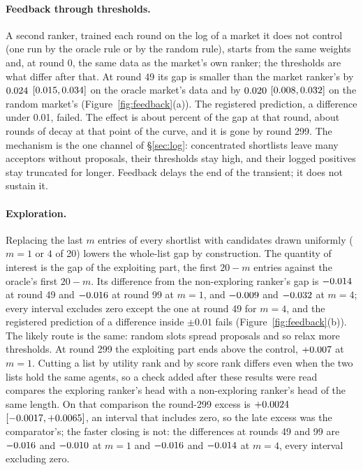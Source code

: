 \paragraph{Feedback through thresholds.} A second ranker, trained each round on
the log of a market it does not control (one run by the oracle rule or by the
random rule), starts from the same weights and, at round 0, the same data as the
market's own ranker; the thresholds are what differ after that. At round 49 its gap
is smaller than the market ranker's by $0.024$ $[0.015,
0.034]$ on the oracle market's data and by $0.020$
$[0.008, 0.032]$ on the random market's
(Figure~\ref{fig:feedback}(a)). The registered prediction, a difference under
0.01, failed. The effect is about \offShare{} percent of the gap at that round,
about \offDelay{} rounds of decay at that point of the curve, and it is gone by
round 299. The mechanism is the one channel of \S\ref{sec:log}: concentrated shortlists
leave many acceptors without proposals, their thresholds stay high, and their
logged positives stay truncated for longer. Feedback delays the end of the
transient; it does not sustain it.

\paragraph{Exploration.} Replacing the last $m$ entries of every shortlist with
candidates drawn uniformly ($m = 1$ or $4$ of 20) lowers the whole-list gap by
construction. The quantity of interest is the gap of the exploiting part, the
first $20 - m$ entries against the oracle's first $20 - m$. Its difference from
the non-exploring ranker's gap is $-0.014$ at round 49 and
$-0.016$ at round 99 at $m = 1$, and $-0.009$ and
$-0.032$ at $m = 4$; every interval excludes zero except the one at
round 49 for $m = 4$, and the registered prediction of a difference inside $\pm
0.01$ fails (Figure~\ref{fig:feedback}(b)). The likely route is the same: random
slots spread proposals and so relax more thresholds. At round 299 the exploiting
part ends above the control, $+0.007$ at $m = 1$. Cutting a list
by utility rank and by score rank differs even when the two lists hold the same
agents, so a check added after these results were read compares the exploring
ranker's head with a non-exploring ranker's head of the same length. On that
comparison the round-299 excess is $+0.0024$
$[-0.0017, +0.0065]$, an interval that
includes zero, so the late excess was the comparator's; the faster closing is not:
the differences at rounds 49 and 99 are $-0.016$ and
$-0.010$ at $m = 1$ and $-0.016$ and
$-0.014$ at $m = 4$, every interval excluding zero.

